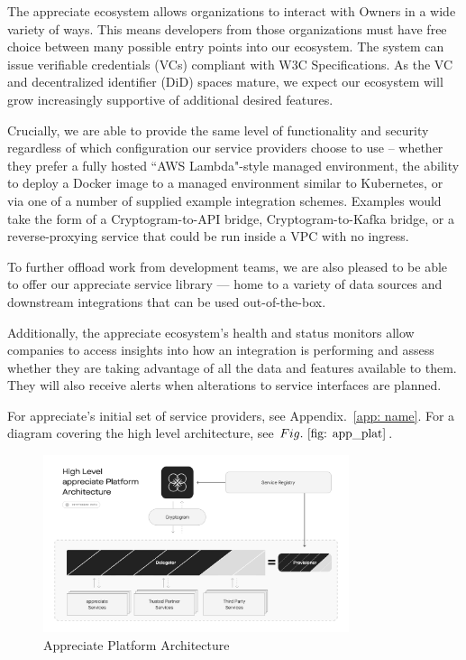 \documentclass[a4paper,onecolumn, 10.5pt]{article}
\begin{document}
The appreciate ecosystem allows organizations to interact with Owners in a wide variety of ways. This means developers from those organizations must have free choice between many possible entry points into our ecosystem. The system can issue verifiable credentials (VCs) compliant with W3C Specifications\cite{verifiablecred}. As the VC and decentralized identifier (DiD) spaces mature, we expect our ecosystem will grow increasingly supportive of additional desired features.

Crucially, we are able to provide the same level of functionality and security regardless of which configuration our service providers choose to use -- whether they prefer a fully hosted “AWS Lambda"-style managed environment, the ability to deploy a Docker image\cite{modernapparch} to a managed environment similar to Kubernetes, 
or via one of a number of supplied example integration schemes. Examples would take the form of a Cryptogram-to-API bridge, Cryptogram-to-Kafka bridge, or a reverse-proxying service that could be run inside a VPC with no ingress.

To further offload work from development teams, we are also pleased to be able to offer our appreciate service library — home to a variety of data sources and downstream integrations that can be used out-of-the-box.

Additionally, the appreciate ecosystem’s health and status monitors allow companies to access insights into how an integration is performing and assess whether they are taking advantage of all the data and features available to them. They will also receive alerts when alterations to service interfaces are planned.


For appreciate’s initial set of service providers, see Appendix.~\ref{app: name}. 
For a diagram covering the high level architecture,  see \(Fig.~\ref{fig: app_plat} \). 

\begin{figure}[!htb]
	\centering %
		\includegraphics[clip, trim=0cm 2cm 0cm 2cm, width=0.80\textwidth]{./images/Architecture.pdf}
	\caption{Appreciate Platform Architecture}
	\label{fig: app_plat}
\end{figure}
\end{document}
